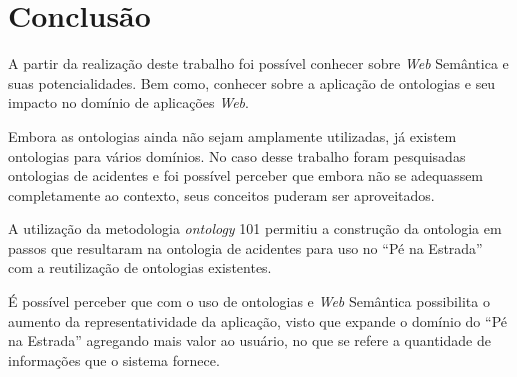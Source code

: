 \chapter{Conclusão}

A partir da realização deste trabalho foi possível conhecer sobre \textit{Web} Semântica e suas potencialidades. 
Bem como, conhecer sobre a aplicação de ontologias e seu impacto no domínio de aplicações \textit{Web}.

Embora as ontologias ainda não sejam amplamente utilizadas, já existem ontologias para vários domínios. No caso
desse trabalho foram pesquisadas ontologias de acidentes e foi possível perceber que embora não se adequassem
completamente ao contexto, seus conceitos puderam ser aproveitados.

A utilização da metodologia \textit{ontology} 101 permitiu a construção da ontologia em passos que resultaram na ontologia
de acidentes para uso no ``Pé na Estrada'' com a reutilização de ontologias existentes.

É possível perceber que com o uso de ontologias e \textit{Web} Semântica possibilita o aumento da representatividade
da aplicação, visto que expande o domínio do ``Pé na Estrada'' agregando mais valor ao usuário, no que se refere a quantidade
de informações que o sistema fornece.